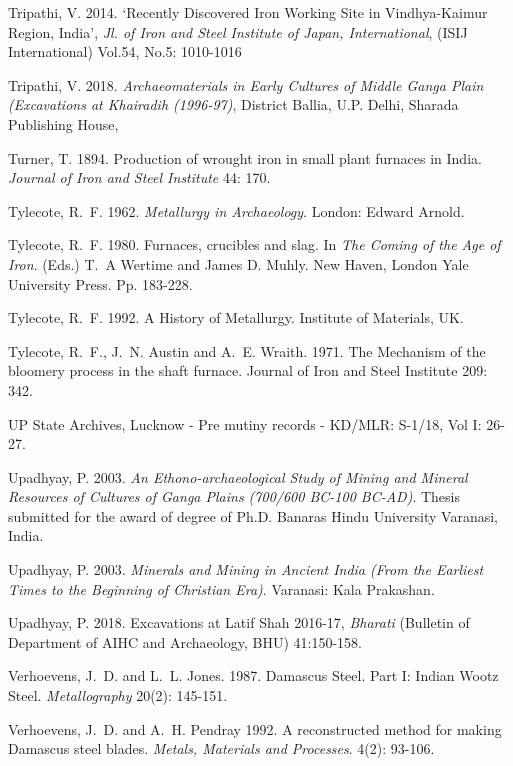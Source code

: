 \begin{thebibliography}{99}
 Tripathi, V. 2014. ‘Recently Discovered Iron Working Site in Vindhya-Kaimur Region, India’, \textit{Jl. of Iron and Steel Institute of Japan, International}, (ISIJ International) Vol.54, No.5: 1010-1016

 Tripathi, V. 2018. \textit{Archaeomaterials in Early Cultures of Middle Ganga Plain (Excavations at Khairadih (1996-97)}, District Ballia, U.P. Delhi, Sharada Publishing House, 
 
 Turner, T. 1894. Production of wrought iron in small plant furnaces in India. \textit{Journal of Iron and Steel Institute} 44: 170. 

 Tylecote, R.~F. 1962. \textit{Metallurgy in Archaeology}. London: Edward Arnold. 

 Tylecote, R.~F. 1980. Furnaces, crucibles and slag. In \textit{The Coming of the Age of Iron}. (Eds.) T.~A Wertime and James D. Muhly. New Haven, London Yale University Press. Pp. 183-228.

 Tylecote, R.~F. 1992. A History of Metallurgy. Institute of Materials, UK.

 Tylecote, R.~F., J.~N. Austin and A.~E. Wraith. 1971. The Mechanism of the bloomery process in the shaft furnace. Journal of Iron and Steel Institute 209: 342.

 UP State Archives, Lucknow - Pre mutiny records - KD/MLR: S-1/18, Vol I: 26-27. 

 Upadhyay, P. 2003. \textit{An Ethono-archaeological Study of Mining and Mineral Resources of Cultures of Ganga Plains (700/600 BC-100 BC-AD)}. Thesis submitted for the award of degree of Ph.D. Banaras Hindu University Varanasi, India.

 Upadhyay, P. 2003. \textit{Minerals and Mining in Ancient India (From the Earliest Times to the Beginning of Christian Era)}. Varanasi: Kala Prakashan.

 Upadhyay, P. 2018. Excavations at Latif Shah 2016-17, \textit{Bharati} (Bulletin of Department of AIHC and Archaeology, BHU) 41:150-158.

 Verhoevens, J.~D. and L.~L. Jones. 1987. Damascus Steel. Part I: Indian Wootz Steel. \textit{Metallography} 20(2): 145-151.

 Verhoevens, J.~D. and A.~H. Pendray 1992. A reconstructed method for making Damascus steel blades. \textit{Metals, Materials and Processes}. 4(2): 93-106.


\end{thebibliography}
